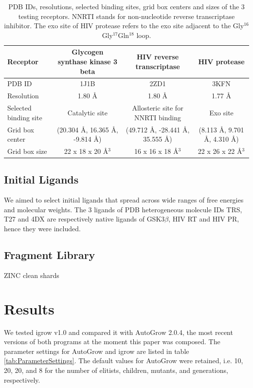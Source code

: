 \documentclass[10pt, conference, compsocconf]{../IEEEtran}
\begin{document}
\begin{table}
\centering
\begin{tabular*}
{\linewidth}
{@{\extracolsep{\fill}}lccc}
\noalign{\smallskip}
\toprule
Receptor & Glycogen synthase kinase 3 beta & HIV reverse transcriptase & HIV protease\\
\midrule
\noalign{\smallskip}
PDB ID & 1J1B & 2ZD1 & 3KFN\\
Resolution & 1.80 \AA & 1.80 \AA & 1.77 \AA\\
Selected binding site & Catalytic site & Allosteric site for NNRTI binding & Exo site\\
Grid box center & (20.304 \AA, 16.365 \AA, -9.814 \AA) & (49.712 \AA, -28.441 \AA, 35.555 \AA) & (8.113 \AA, 9.701 \AA, 4.310 \AA) \\
Grid box size & 22 x 18 x 20 \AA$^3$ & 16 x 16 x 18 \AA$^3$ & 22 x 26 x 22 \AA$^3$\\
\bottomrule
\end{tabular*}
\caption{PDB IDs, resolutions, selected binding sites, grid box centers and sizes of the 3 testing receptors. NNRTI stands for non-nucleotide reverse transcriptase inhibitor. The exo site of HIV protease refers to the exo site adjacent to the Gly$^{16}$Gly$^{17}$Gln$^{18}$ loop.}
\label{tab:searchspace}
\end{table}

\subsection{Initial Ligands}

We aimed to select initial ligands that spread across wide ranges of free energies and molecular weights. The 3 ligands of PDB heterogeneous molecule IDs TRS, T27 and 4DX are respectively native ligands of GSK3$\beta$, HIV RT and HIV PR, hence they were included.

\subsection{Fragment Library}

ZINC clean shards

\section{Results}

We tested igrow v1.0 and compared it with AutoGrow 2.0.4, the most recent versions of both programs at the moment this paper was composed. The parameter settings for AutoGrow and igrow are listed in table \ref{tab:ParameterSettings}. The default values for AutoGrow were retained, i.e. 10, 20, 20, and 8 for the number of elitists, children, mutants, and generations, respectively.
\end{document}
